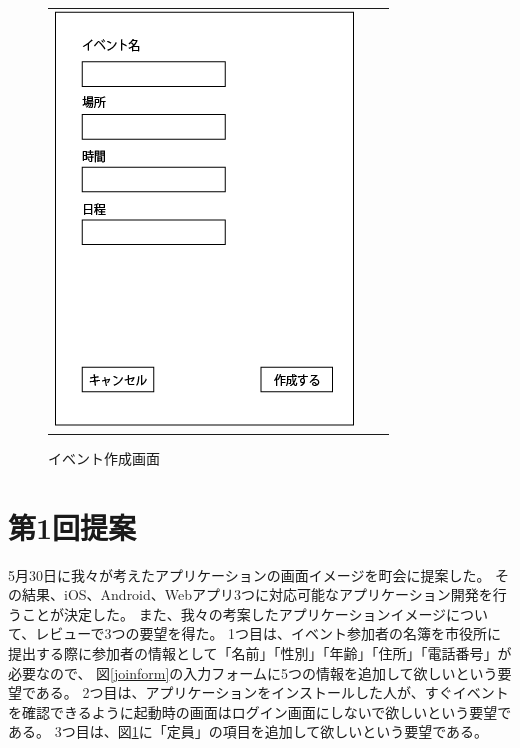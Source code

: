 \begin{figure}[h]
\begin{tabular}{ccc}
\begin{minipage}[t]{0.33\hsize}
        \caption{参加フォーム画面}
        \label{joinform}
      \end{minipage}
      \begin{minipage}[t]{0.33\hsize}
        \centering
        \includegraphics[keepaspectratio, scale=0.4]{process_figures/old_create_event.png}
        \caption{イベント作成画面}
        \label{create_event.old}
      \end{minipage}
    \end{tabular}
\end{figure}

\section{第1回提案}
\label{first_review}
5月30日に我々が考えたアプリケーションの画面イメージを町会に提案した。
その結果、iOS、Android、Webアプリ3つに対応可能なアプリケーション開発を行うことが決定した。
また、我々の考案したアプリケーションイメージについて、レビューで3つの要望を得た。
1つ目は、イベント参加者の名簿を市役所に提出する際に参加者の情報として「名前」「性別」「年齢」「住所」「電話番号」が必要なので、
図\ref{joinform}の入力フォームに5つの情報を追加して欲しいという要望である。
2つ目は、アプリケーションをインストールした人が、すぐイベントを確認できるように起動時の画面はログイン画面にしないで欲しいという要望である。
3つ目は、図\ref{create_event.old}に「定員」の項目を追加して欲しいという要望である。

